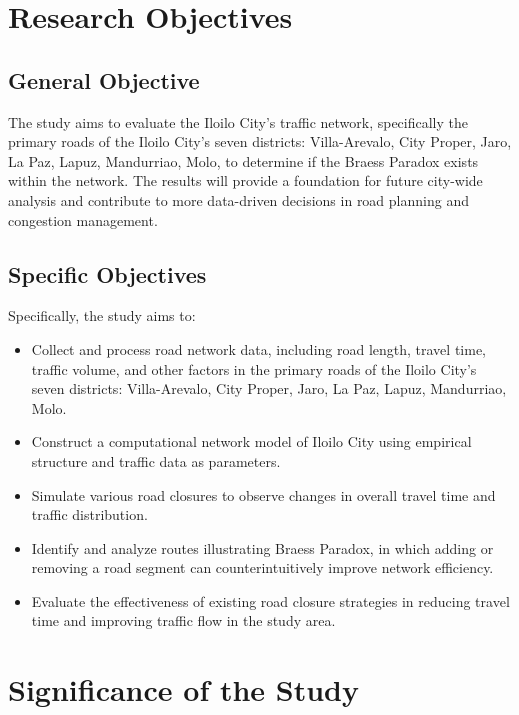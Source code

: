 \section{Research Objectives}
\label{sec:research_objectives}

\subsection{General Objective}
\label{sec:general_objective}

The study aims to evaluate the Iloilo City's traffic network, specifically the primary roads of the Iloilo City's seven districts: Villa-Arevalo, City Proper, Jaro, La Paz, Lapuz, Mandurriao, Molo, to determine if the Braess Paradox exists within the network. The results will provide a foundation for future city-wide analysis and contribute to more data-driven decisions in road planning and congestion management. 

\subsection{Specific Objectives}
\label{sec:specific_objectives}

Specifically, the study aims to:

\begin{itemize}
    \item Collect and process road network data, including road length, travel time, traffic volume, and other factors in the primary roads of the Iloilo City's seven districts: Villa-Arevalo, City Proper, Jaro, La Paz, Lapuz, Mandurriao, Molo.
    \item Construct a computational network model of Iloilo City using empirical structure and traffic data as parameters.
    \item Simulate various road closures to observe changes in overall travel time and traffic distribution.
    \item Identify and analyze routes illustrating Braess Paradox, in which adding or removing a road segment can counterintuitively improve network efficiency.
    \item Evaluate the effectiveness of existing road closure strategies in reducing travel time and improving traffic flow in the study area.
\end{itemize}

\section{Significance of the Study}
\label{sec:significance_of_the_study}

